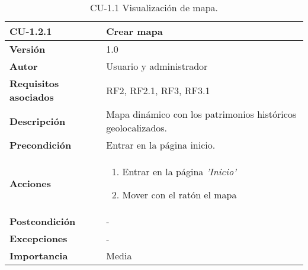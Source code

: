 \begin{table}[h!]
	\centering
	\begin{tabularx}{\linewidth}{ p{} p{} }
		\toprule
		\textbf{CU-1.2.1}    & \textbf{Crear mapa}\\
		\toprule
		\textbf{Versión}              & 1.0    \\
		\textbf{Autor}                & Usuario y administrador \\
		\textbf{Requisitos asociados} & RF2, RF2.1, RF3, RF3.1 \\
		\textbf{Descripción}          & Mapa dinámico con los patrimonios históricos geolocalizados. \\
		\textbf{Precondición}         & Entrar en la página inicio. \\
		\textbf{Acciones}             &
		\begin{enumerate}
			\def\labelenumi{\arabic{enumi}.}
			\tightlist
			\item Entrar en la página \textit{'Inicio'}
			\item Mover con el ratón el mapa
		\end{enumerate}\\
		\textbf{Postcondición}        &  -\\
		\textbf{Excepciones}          &  -\\
		\textbf{Importancia}          & Media \\
		\bottomrule
	\end{tabularx}
	\caption{CU-1.1 Visualización de mapa.}
\end{table}
